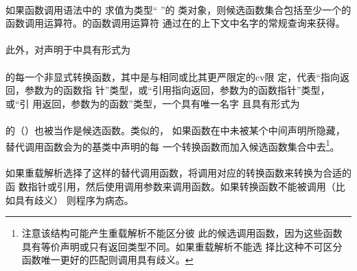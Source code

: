 \paragraph{}
如果函数调用语法中的 求值为类型`` ''的
类对象，则候选函数集合包括至少一个的函数调用运算符。的函数调用运算符
通过在的上下文中名字的常规查询来获得。

\paragraph{}
此外，对声明于中具有形式为                                              \\
\mbox{}                                          \\
的每一个非显式转换函数，其中是与相同或比其更严限定的cv限
定，代表``指向返回，参数为的函数指
针''类型，或``引用指向返回，参数为的函数指针''类型，或``引
用返回，参数为的函数''类型，一个具有唯一名字
且具有形式为                                                \\
\mbox{}                                                     \\
的（）也被当作是候选函数。类似的，
如果函数在中未被某个中间声明所隐藏，替代调用函数会为的基类中声明的每
一个转换函数而加入候选函数集合中去\footnote{注意该结构可能产生重载解析不能区分彼
此的候选调用函数，因为这些函数具有等价声明或只有返回类型不同。如果重载解析不能选
择比这种不可区分函数唯一更好的匹配则调用具有歧义。}。

\paragraph{}
如果重载解析选择了这样的替代调用函数，将调用对应的转换函数来转换为合适的函
数指针或引用，然后使用调用参数来调用函数。如果转换函数不能被调用（比如具有歧义）
则程序为病态。

